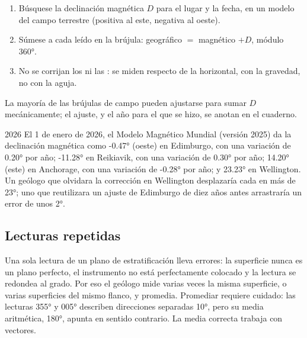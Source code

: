 \begin{method}\label{met:b1:field-lab-methods-1:declination}
\begin{enumerate}
  \item Búsquese la declinación magnética $D$ para el lugar y la fecha, en un modelo del campo
        terrestre (positiva al este, negativa al oeste).
  \item Súmese a cada  leído en la brújula:  geográfico $=$  magnético $+ D$,
        módulo \ang{360}.
  \item No se corrijan los  ni las : se miden respecto de la horizontal, con la
        gravedad, no con la aguja.
\end{enumerate}
La mayoría de las brújulas de campo pueden ajustarse para sumar $D$ mecánicamente; el ajuste, y el año
para el que se hizo, se anotan en el cuaderno.
\end{method}

\begin{dated}{2026}
El 1 de enero de 2026, el Modelo Magnético Mundial (versión 2025) da la declinación magnética como
\ang{-0.47} (oeste) en Edimburgo, con una variación de \ang{+0.20} por año; \ang{-11.28} en Reikiavik,
con una variación de \ang{+0.30} por año; \ang{+14.20} (este) en Anchorage, con una variación de
\ang{-0.28} por año; y \ang{+23.23} en Wellington. Un geólogo que olvidara la corrección en Wellington
desplazaría cada  en más de \ang{23}; uno que reutilizara un ajuste de Edimburgo de diez años
antes arrastraría un error de unos \ang{2}.
\end{dated}

\subsection{Lecturas repetidas}

Una sola lectura de un plano de estratificación lleva errores: la superficie nunca es un plano
perfecto, el instrumento no está perfectamente colocado y la lectura se redondea al grado. Por eso el
geólogo mide varias veces la misma superficie, o varias superficies del mismo flanco, y promedia.
Promediar  requiere cuidado: las lecturas \ang{355} y \ang{005} describen direcciones separadas
\ang{10}, pero su media aritmética, \ang{180}, apunta en sentido contrario. La media correcta trabaja con
vectores.

